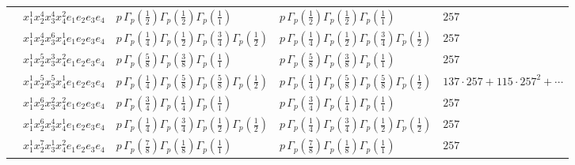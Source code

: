 \documentclass[11pt]{article}
\begin{document}
\begin{table}[ht]
{\begin{tabular}{@{}lllll@{}}
 & $x_{1}^{1} x_{2}^{4} x_{3}^{4} x_{4}^{2}  e_{1} e_{2} e_{3} e_{4}$ & $p \, \Gamma_p \left( \frac{1}{2} \right) \Gamma_p \left( \frac{1}{2} \right) \Gamma_p \left( \frac{1}{1} \right)$ & $p \, \Gamma_p \left( \frac{1}{2} \right) \Gamma_p \left( \frac{1}{2} \right) \Gamma_p \left( \frac{1}{1} \right)$ & $257$ \\
 & $x_{1}^{1} x_{2}^{4} x_{3}^{6} x_{4}^{1}  e_{1} e_{2} e_{3} e_{4}$ & $p \, \Gamma_p \left( \frac{1}{4} \right) \Gamma_p \left( \frac{1}{2} \right) \Gamma_p \left( \frac{3}{4} \right) \Gamma_p \left( \frac{1}{2} \right)$ & $p \, \Gamma_p \left( \frac{1}{4} \right) \Gamma_p \left( \frac{1}{2} \right) \Gamma_p \left( \frac{3}{4} \right) \Gamma_p \left( \frac{1}{2} \right)$ & $257$ \\
 & $x_{1}^{1} x_{2}^{5} x_{3}^{3} x_{4}^{2}  e_{1} e_{2} e_{3} e_{4}$ & $p \, \Gamma_p \left( \frac{5}{8} \right) \Gamma_p \left( \frac{3}{8} \right) \Gamma_p \left( \frac{1}{1} \right)$ & $p \, \Gamma_p \left( \frac{5}{8} \right) \Gamma_p \left( \frac{3}{8} \right) \Gamma_p \left( \frac{1}{1} \right)$ & $257$ \\
 & $x_{1}^{1} x_{2}^{5} x_{3}^{5} x_{4}^{1}  e_{1} e_{2} e_{3} e_{4}$ & $p \, \Gamma_p \left( \frac{1}{4} \right) \Gamma_p \left( \frac{5}{8} \right) \Gamma_p \left( \frac{5}{8} \right) \Gamma_p \left( \frac{1}{2} \right)$ & $p \, \Gamma_p \left( \frac{1}{4} \right) \Gamma_p \left( \frac{5}{8} \right) \Gamma_p \left( \frac{5}{8} \right) \Gamma_p \left( \frac{1}{2} \right)$ & $137{\cdot}257{+}115{\cdot}257^{2}{+}\cdots$ \\
 & $x_{1}^{1} x_{2}^{6} x_{3}^{2} x_{4}^{2}  e_{1} e_{2} e_{3} e_{4}$ & $p \, \Gamma_p \left( \frac{3}{4} \right) \Gamma_p \left( \frac{1}{4} \right) \Gamma_p \left( \frac{1}{1} \right)$ & $p \, \Gamma_p \left( \frac{3}{4} \right) \Gamma_p \left( \frac{1}{4} \right) \Gamma_p \left( \frac{1}{1} \right)$ & $257$ \\
 & $x_{1}^{1} x_{2}^{6} x_{3}^{4} x_{4}^{1}  e_{1} e_{2} e_{3} e_{4}$ & $p \, \Gamma_p \left( \frac{1}{4} \right) \Gamma_p \left( \frac{3}{4} \right) \Gamma_p \left( \frac{1}{2} \right) \Gamma_p \left( \frac{1}{2} \right)$ & $p \, \Gamma_p \left( \frac{1}{4} \right) \Gamma_p \left( \frac{3}{4} \right) \Gamma_p \left( \frac{1}{2} \right) \Gamma_p \left( \frac{1}{2} \right)$ & $257$ \\
 & $x_{1}^{1} x_{2}^{7} x_{3}^{1} x_{4}^{2}  e_{1} e_{2} e_{3} e_{4}$ & $p \, \Gamma_p \left( \frac{7}{8} \right) \Gamma_p \left( \frac{1}{8} \right) \Gamma_p \left( \frac{1}{1} \right)$ & $p \, \Gamma_p \left( \frac{7}{8} \right) \Gamma_p \left( \frac{1}{8} \right) \Gamma_p \left( \frac{1}{1} \right)$ & $257$ \\

\end{tabular}}
\end{table}
\end{document}
